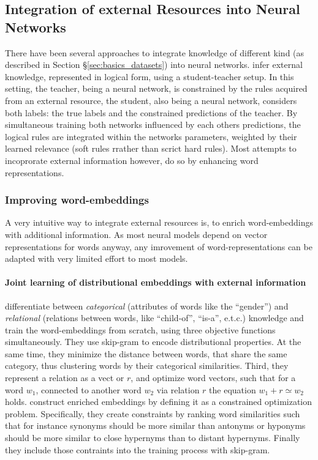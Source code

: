\subsection{Integration of external Resources into Neural Networks}\label{sec:ext_res_in_nn}
There have been several approaches to integrate knowledge of different kind (as described in Section §\ref{sec:basics_datasets}) into neural networks. \cite{hu2016deep} infer external knowledge, represented in logical form, using a student-teacher setup. In this setting, the teacher, being a neural network, is constrained by the rules acquired from an external resource, the student, also being a neural network, considers both labels: the true labels and the constrained predictions of the teacher. By simultaneous training both networks influenced by each others predictions, the logical rules are integrated within the networks parameters, weighted by their learned relevance (soft rules rrather than scrict hard rules). Most attempts to incoprorate external information however, do so by enhancing word representations.
\subsubsection{Improving word-embeddings}\label{sec:embeddings_improvements_relwork}
A very intuitive way to integrate external resources is, to enrich word-embeddings with additional information. As most neural models depend on vector representations for words anyway, any imrovement of word-representations can be adapted with very limited effort to most models.

\paragraph*{Joint learning of distributional embeddings with external information}
\cite{xu2014rc} differentiate between \textit{categorical} (attributes of words like the ``gender'') and \textit{relational} (relations between words, like ``child-of'', ``is-a'', e.t.c.) knowledge and train the word-embeddings from scratch, using three objective functions simultaneously. They use skip-gram to encode distributional properties. At the same time, they minimize the distance between words, that share the same category, thus clustering words by their categorical similarities. Third, they represent a relation as a vect or $r$,  and optimize word vectors, such that for a word $w_1$, connected to another word $w_2$ via relation $r$ the equation $w_1 + r \simeq w_2$ holds. \cite{liu2015learning} construct enriched embeddings by defining it as a constrained optimization problem. Specifically, they create constraints by ranking word similarities such that for instance synonyms should be more similar than antonyms or hyponyms should be more similar to close hypernyms than to distant hypernyms. Finally they include those contraints into the training process with skip-gram. 
